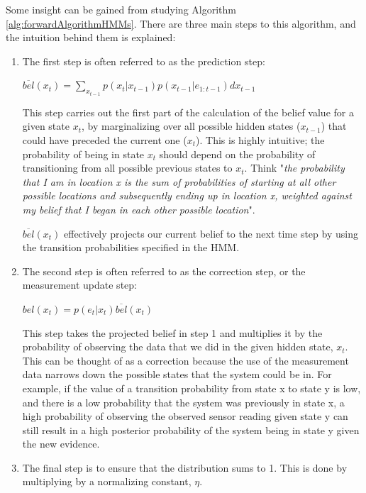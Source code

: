 Some insight can be gained from studying Algorithm \ref{alg:forwardAlgorithmHMMs}. There are three main steps to this algorithm, and the intuition behind them is explained: 
\begin{enumerate}
    
    \item The first step is often referred to as the prediction step:
    \begin{center}
    $\overline{bel}(x_t) = \sum_{x_{t-1}} p(x_t | x_{t-1}) p(x_{t-1} | e_{1:t-1}) d x_{t-1}$
    \end{center}

    This step carries out the first part of the calculation of the belief value for a given state $x_t$, by marginalizing over all possible hidden states ($x_{t-1}$) that could have preceded the current one ($x_t$). This is highly intuitive; the probability of being in state $x_t$ should depend on the probability of transitioning from all possible previous states to $x_t$. 
    Think "\textit{the probability that I am in location x is the sum of probabilities of starting at all other possible locations and subsequently ending up in location x, weighted against my belief that I began in each other possible location}".
    
    $\overline{bel}(x_t)$ effectively projects our current belief to the next time step by using the transition probabilities specified in the HMM.
    
    \item The second step is often referred to as the correction step, or the measurement update step: 
    \begin{center}
    $bel(x_t) = p(e_t | x_t) \overline{bel}(x_t)$ 
    \end{center}
    This step takes the projected belief in step 1 and multiplies it by the probability of observing the data that we did in the given hidden state, $x_t$. This can be thought of as a correction because the use of the measurement data narrows down the possible states that the system could be in. 
    For example, if the value of a transition probability from state x to state y is low, and there is a low probability that the system was previously in state x, a high probability of observing the observed sensor reading given state y can still result in a high posterior probability of the system being in state y given the new evidence.
    
    \item The final step is to ensure that the distribution sums to 1. This is done by multiplying by a normalizing constant, $\eta$.
    
    
\end{enumerate}
